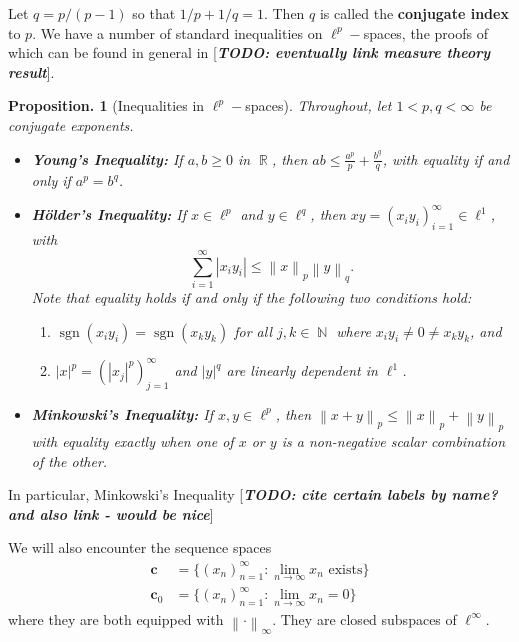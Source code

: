 \documentclass[11pt, a4paper]{memoir}
\DeclareMathOperator{\N}{{\mathbb{N}}}
\DeclareMathOperator{\R}{{\mathbb{R}}}
\newcommand{\norm}[1]{\ensuremath{\left\lVert#1\right\rVert}}
\newcommand{\abs}[1]{\ensuremath{\left\lvert#1\right\rvert}}
\theoremstyle{change}
\newtheorem{proposition}[theorem]{Proposition.}
\theoremstyle{plain}
\theoremstyle{nonumberplain}
\DeclareMathOperator{\sgn}{sgn}
\newcommand{\TODO}[1]{[\textit{\textbf{TODO: #1}}]}
\newcommand{\lp}[1]{\ensuremath{\ell^{#1}}}
\newcommand{\csn}{\ensuremath{\mathbf{c}}}
\newcommand{\csz}{\ensuremath{\mathbf{c}_0}}
\numberwithin{equation}{section}
\begin{document}
Let $q=p/(p-1)$ so that $1/p+1/q=1$.
Then $q$ is called the \textbf{conjugate index} to $p$.
We have a number of standard inequalities on $\lp{p}-$spaces, the proofs of which can be found in general in \TODO{eventually link measure theory result}.
\begin{proposition}[Inequalities in $\lp{p}-$spaces]
    Throughout, let $1<p,q<\infty$ be conjugate exponents.
    \begin{itemize}
        \item \textbf{Young's Inequality:} If $a,b\geq 0$ in $\R$, then $ab\leq \frac{a^p}{p}+\frac{b^q}{q}$, with equality if and only if $a^p=b^q$.
        \item \textbf{Hölder's Inequality:} If $x\in\lp{p}$ and $y\in\lp{q}$, then $xy=(x_iy_i)_{i=1}^\infty\in\lp{1}$, with
            \begin{equation*}
                \sum_{i=1}^\infty \abs{x_iy_i}\leq\norm{x}_p\norm{y}_q.
            \end{equation*}
            Note that equality holds if and only if the following two conditions hold:
            \begin{enumerate}[nl,r]
                \item $\sgn(x_iy_i)=\sgn(x_ky_k)$ for all $j,k\in\N$ where $x_iy_i\neq 0\neq x_ky_k$, and
                \item $|x|^p=(|x_j|^p)_{j=1}^\infty$ and $|y|^q$ are linearly dependent in $\lp{1}$.
            \end{enumerate}
        \item \textbf{Minkowski's Inequality:} If $x,y\in\lp{p}$, then $\norm{x+y}_p\leq\norm{x}_p+\norm{y}_p$ with equality exactly when one of $x$ or $y$ is a non-negative scalar combination of the other.
    \end{itemize}
\end{proposition}
In particular, Minkowski's Inequality \TODO{cite certain labels by name? and also link - would be nice}

We will also encounter the sequence spaces
\begin{align*}
    \csn&=\{(x_n)_{n=1}^\infty:\lim_{n\to\infty}x_n\text{ exists}\}\\
    \csz&=\{(x_n)_{n=1}^\infty:\lim_{n\to\infty}x_n=0\}
\end{align*}
where they are both equipped with $\norm{\cdot}_\infty$.
They are closed subspaces of $\lp{\infty}$.
\end{document}
